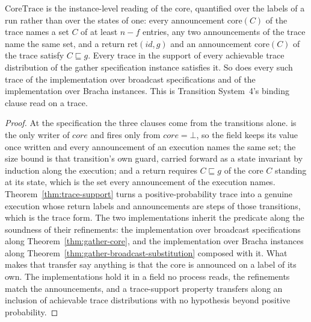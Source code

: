 \begin{theorem}
  \label{thm:aba-gather-commoncore}
  \leanok
  $\mathrm{CoreTrace}$ is the instance-level reading of the core, quantified over the labels of a run rather than over the states of one: every announcement $\mathrm{core}(C)$ of the trace names a set $C$ of at least $n - f$ entries, any two announcements of the trace name the same set, and a return $\mathrm{ret}(id, g)$ and an announcement $\mathrm{core}(C)$ of the trace satisfy $C \sqsubseteq g$.
  Every trace in the support of every achievable trace distribution of the gather specification instance satisfies it.\leanok{} So does every such trace of the implementation over broadcast specifications and of the implementation over Bracha instances.\leanok{} This is Transition System~4's binding clause read on a trace.
\end{theorem}

\begin{proof}\leanok
  At the specification the three clauses come from the transitions alone.
   is the only writer of $core$ and fires only from $core = \bot$, so the field keeps its value once written and every announcement of an execution names the same set; the size bound is that transition's own guard, carried forward as a state invariant by induction along the execution; and a return requires $C \sqsubseteq g$ of the core $C$ standing at its state, which is the set every announcement of the execution names.
  Theorem~\ref{thm:trace-support} turns a positive-probability trace into a genuine execution whose return labels and announcements are steps of those transitions, which is the trace form.
  The two implementations inherit the predicate along the soundness of their refinements: the implementation over broadcast specifications along Theorem~\ref{thm:gather-core}, and the implementation over Bracha instances along Theorem~\ref{thm:gather-broadcast-substitution} composed with it.
  What makes that transfer say anything is that the core is announced on a label of its own.
  The implementations hold it in a field no process reads, the refinements match the announcements, and a trace-support property transfers along an inclusion of achievable trace distributions with no hypothesis beyond positive probability.
\end{proof}
